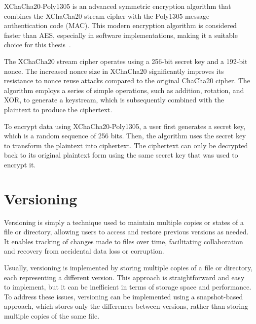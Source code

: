 XChaCha20-Poly1305 is an advanced symmetric encryption algorithm that combines the XChaCha20 stream cipher with the Poly1305 message authentication code (MAC).
This modern encryption algorithm is considered faster than AES, especially in software implementations, making it a suitable choice for this thesis~\cite{crypto_pp_xchacha20poly1305}.

The XChaCha20 stream cipher operates using a 256-bit secret key and a 192-bit nonce.
The increased nonce size in XChaCha20 significantly improves its resistance to nonce reuse attacks compared to the original ChaCha20 cipher.
The algorithm employs a series of simple operations, such as addition, rotation, and XOR, to generate a keystream, which is subsequently combined with the plaintext to produce the ciphertext.

To encrypt data using XChaCha20-Poly1305, a user first generates a secret key, which is a random sequence of 256 bits.
Then, the algorithm uses the secret key to transform the plaintext into ciphertext.
The ciphertext can only be decrypted back to its original plaintext form using the same secret key that was used to encrypt it.

\section{Versioning}\label{sec:versioning}

Versioning is simply a technique used to maintain multiple copies or states of a file or directory, allowing users to access and restore previous versions as needed.
It enables tracking of changes made to files over time, facilitating collaboration and recovery from accidental data loss or corruption.

Usually, versioning is implemented by storing multiple copies of a file or directory, each representing a different version.
This approach is straightforward and easy to implement, but it can be inefficient in terms of storage space and performance.
To address these issues, versioning can be implemented using a snapshot-based approach, which stores only the differences between versions, rather than storing multiple copies of the same file.